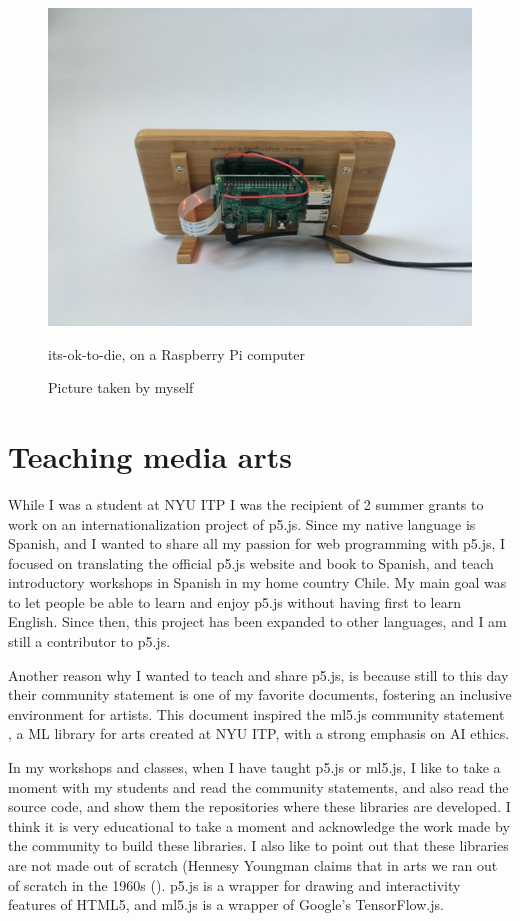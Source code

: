 \begin{figure}[ht]
  \centering
  \includegraphics[width=0.75\linewidth,height=0.35\textheight,keepaspectratio]{images/its-ok-to-die-raspberry.jpg}
  \caption{its-ok-to-die, on a Raspberry Pi computer}
  \caption*{Picture taken by myself}
  \label{fig:its-ok-to-die-raspberry}
\end{figure}

\section{Teaching media arts}

While I was a student at \acrshort{NYU} \acrshort{ITP} I was the recipient of 2 summer grants to work on an internationalization project of p5.js. Since my native language is Spanish, and I wanted to share all my passion for web programming with p5.js, I focused on translating the official p5.js website and book to Spanish, and teach introductory workshops in Spanish in my home country Chile. My main goal was to let people be able to learn and enjoy p5.js without having first to learn English. Since then, this project has been expanded to other languages, and I am still a contributor to p5.js.

Another reason why I wanted to teach and share p5.js, is because still to this day their community statement \cite{website-p5js-community-statement} is one of my favorite documents, fostering an inclusive environment for artists. This document inspired the ml5.js community statement \cite{website-ml5js-community-statement}, a \acrshort{ML} library for arts created at \acrshort{NYU} \acrshort{ITP}, with a strong emphasis on \acrshort{AI} ethics.

In my workshops and classes, when I have taught p5.js or ml5.js, I like to take a moment with my students and read the community statements, and also read the source code, and show them the repositories where these libraries are developed. I think it is very educational to take a moment and acknowledge the work made by the community to build these libraries. I also like to point out that these libraries are not made out of scratch (Hennesy Youngman claims that in arts we ran out of scratch in the 1960s (\cite{hennesy-youngman-art-thoughtz-how-to-make-an-art}). p5.js is a wrapper for drawing and interactivity features of HTML5, and ml5.js is a wrapper of Google's TensorFlow.js.

